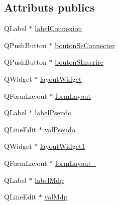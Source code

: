\subsection*{Attributs publics}
\begin{DoxyCompactItemize}
\item 
Q\-Label $\ast$ \hyperlink{class_ui___dialog_connexion_ad90d75071d6c9d6e5539a7115156f5eb}{label\-Connexion}
\item 
Q\-Push\-Button $\ast$ \hyperlink{class_ui___dialog_connexion_a5c7679d0477929e0d177aa38f9277f62}{bouton\-Se\-Connecter}
\item 
Q\-Push\-Button $\ast$ \hyperlink{class_ui___dialog_connexion_a11208b09a06acbe25a6c352bdd4c0b3b}{bouton\-S\-Inscrire}
\item 
Q\-Widget $\ast$ \hyperlink{class_ui___dialog_connexion_afeb60fc13dde76b19301251dddc60e21}{layout\-Widget}
\item 
Q\-Form\-Layout $\ast$ \hyperlink{class_ui___dialog_connexion_aeddc51c77c362a789e75246e03e62713}{form\-Layout}
\item 
Q\-Label $\ast$ \hyperlink{class_ui___dialog_connexion_a10c9345fc39e8cc6c73531d688ff13ae}{label\-Pseudo}
\item 
Q\-Line\-Edit $\ast$ \hyperlink{class_ui___dialog_connexion_a4560ad500c66e02c38d52f01b71c5c8b}{val\-Pseudo}
\item 
Q\-Widget $\ast$ \hyperlink{class_ui___dialog_connexion_a89b895d2240121522d39f47995075b71}{layout\-Widget1}
\item 
Q\-Form\-Layout $\ast$ \hyperlink{class_ui___dialog_connexion_ad824817e926068b482b4bf73f9632086}{form\-Layout\-\_}
\item 
Q\-Label $\ast$ \hyperlink{class_ui___dialog_connexion_aa6e5c9b46e3423bd6427192e6fd499a1}{label\-Mdp}
\item 
Q\-Line\-Edit $\ast$ \hyperlink{class_ui___dialog_connexion_ae59151879eebdd101eaae39a532cdff8}{val\-Mdp}
\end{DoxyCompactItemize}



